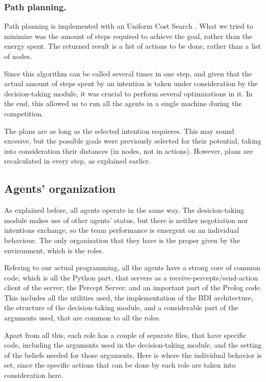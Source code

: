 \documentclass{llncs2e/llncs}
\begin{document}
\subsubsection{Path planning.}

    Path planning is implemented with an Uniform Cost Search 
    \cite{Russell:2003:AIM:773294}. 
    What we tried to minimize was the amount of steps required to achieve the 
    goal, rather than the energy spent. 
    The returned result is a list of actions to be done, rather than a list of 
    nodes.
    
    Since this algorithm can be called several times in one step, and given that the 
    actual amount of steps spent by an intention is taken under consideration by 
    the decision-taking module, it was crucial to perform several optimizations in 
    it. In the end, this allowed us to run all the agents in a single machine  
    during the competition.
    
    The plans are as long as the selected intention requieres. This may 
    sound excesive, but the possible goals were previously selected for their 
    potential, taking into consideration their distances (in nodes, not in 
    actions). However, plans are recalculated in every step, as explained earlier.    

\subsection{Agents' organization}

    As explained before, all agents operate in the same way. The desicion-taking
    module makes use of other agents' status, but there is neither negotiation nor 
    intentions exchange, so the team performance is emergent on an individual behaviour. 
    The only organization that they have is the proper given by the environment, 
    which is the roles.
    
    Refering to our actual programming, all the agents have a strong core of common
    code, which is all the Python part, that servers as a receive-percepts/send-action client 
    of the server; the Percept Server; and an important part of the Prolog code. This includes all the 
    utilities used, the implementation of the BDI architecture, the structure of the 
    decision-taking module, and a considerable part of the arguments used, that
    are common to all the roles.
        
    Apart from all this, each role has a couple of separate files, that have 
    specific code, including the arguments used in the decision-taking module, and
    the setting of the beliefs needed for those arguments. Here is where the 
    individual behavior is set, since the specific actions that can be done by each
    role are taken into consideration here.
    
\end{document}
